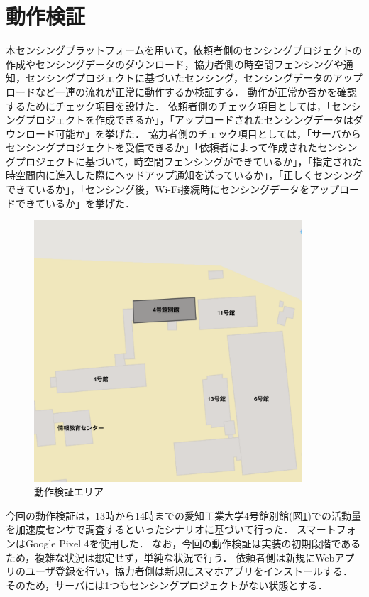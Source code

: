 \section{動作検証}
本センシングプラットフォームを用いて，依頼者側のセンシングプロジェクトの作成やセンシングデータのダウンロード，協力者側の時空間フェンシングや通知，センシングプロジェクトに基づいたセンシング，センシングデータのアップロードなど一連の流れが正常に動作するか検証する．
動作が正常か否かを確認するためにチェック項目を設けた．
依頼者側のチェック項目としては，「センシングプロジェクトを作成できるか」，「アップロードされたセンシングデータはダウンロード可能か」を挙げた．
協力者側のチェック項目としては，「サーバからセンシングプロジェクトを受信できるか」「依頼者によって作成されたセンシングプロジェクトに基づいて，時空間フェンシングができているか」，「指定された時空間内に進入した際にヘッドアップ通知を送っているか」，「正しくセンシングできているか」，「センシング後，Wi-Fi接続時にセンシングデータをアップロードできているか」を挙げた．

\begin{figure}[H]
  \centering
  \includegraphics[width=100mm]{VerificationArea.png}
  \caption{動作検証エリア}
  \label{VerificationArea}
\end{figure}

今回の動作検証は，13時から14時までの愛知工業大学4号館別館(図\ref{VerificationArea})での活動量を加速度センサで調査するといったシナリオに基づいて行った．
スマートフォンはGoogle Pixel 4を使用した．
なお，今回の動作検証は実装の初期段階であるため，複雑な状況は想定せず，単純な状況で行う．
依頼者側は新規にWebアプリのユーザ登録を行い，協力者側は新規にスマホアプリをインストールする．
そのため，サーバには1つもセンシングプロジェクトがない状態とする．

